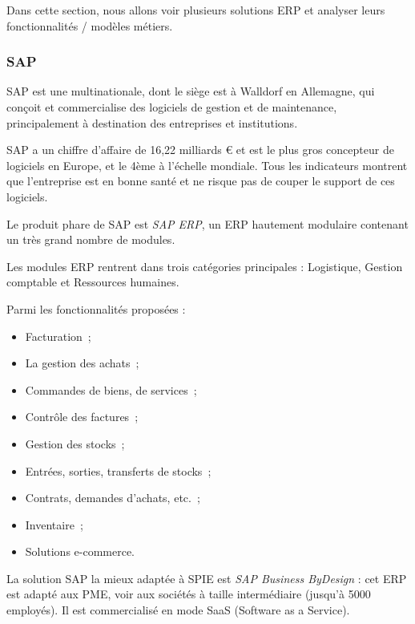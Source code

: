         Dans cette section, nous allons voir plusieurs solutions ERP et analyser leurs fonctionnalités / modèles métiers.

        \subsubsection{SAP}

            SAP est une multinationale, dont le siège est à Walldorf en Allemagne, qui conçoit et commercialise des logiciels de gestion et de maintenance, principalement à destination des entreprises et institutions.

            SAP a un chiffre d'affaire de 16,22 milliards € et est le plus gros concepteur de logiciels en Europe, et le 4ème à l'échelle mondiale. Tous les indicateurs montrent que l'entreprise est en bonne santé et ne risque pas de couper le support de ces logiciels.

            Le produit phare de SAP est \textit{SAP ERP}, un ERP hautement modulaire contenant un très grand nombre de modules.

            Les modules ERP rentrent dans trois catégories principales : Logistique, Gestion comptable et Ressources humaines.

            Parmi les fonctionnalités proposées :

            \begin{itemize}
                \item Facturation~;
                \item La gestion des achats~;
                \item Commandes de biens, de services~;
                \item Contrôle des factures~;
                \item Gestion des stocks~;
                \item Entrées, sorties, transferts de stocks~;
                \item Contrats, demandes d'achats, etc.~;
                \item Inventaire~;
                \item Solutions e-commerce.
            \end{itemize}


            La solution SAP la mieux adaptée à SPIE est \textit{SAP Business ByDesign} : cet ERP est adapté aux PME, voir aux sociétés à taille intermédiaire (jusqu'à 5000 employés). Il est commercialisé en mode SaaS (Software as a Service).


